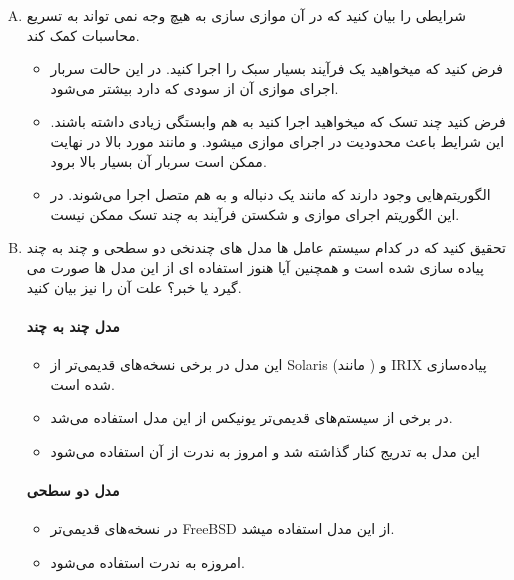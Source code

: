 \documentclass[]{article}
\begin{document}
\begin{enumerate}[(A)]
      \item ﺷﺮﺍﯾﻄﯽ ﺭﺍ ﺑﯿﺎﻥ ﮐﻨﯿﺪ ﮐﻪ ﺩﺭ ﺁﻥ ﻣﻮﺍﺯﯼ ﺳﺎﺯﯼ ﺑﻪ ﻫﯿﭻ ﻭﺟﻪ ﻧﻤﯽ ﺗﻮﺍﻧﺪ ﺑﻪ ﺗﺴﺮﯾﻊ ﻣﺤﺎﺳﺒﺎﺕ ﮐﻤﮏ ﮐﻨﺪ.
            \begin{itemize}
                  \renewcommand\labelitemi{-}
                  \item فرض کنید که میخواهید یک فرآیند بسیار سبک را اجرا کنید. در این حالت سربار اجرای موازی آن از سودی که دارد بیشتر می‌شود.
                  \item فرض کنید چند تسک که میخواهید اجرا کنید به هم وابستگی زیادی داشته باشند.
                        این شرایط باعث محدودیت در اجرای موازی میشود. و مانند مورد بالا در نهایت ممکن است سربار آن بسیار بالا برود.
                  \item الگوریتم‌هایی وجود دارند که مانند یک دنباله و به هم متصل اجرا می‌شوند.
                        در این الگوریتم‌ اجرای موازی و شکستن فرآیند به چند تسک ممکن نیست.
            \end{itemize}
      \item ﺗﺤﻘﯿﻖ ﮐﻨﯿﺪ ﮐﻪ ﺩﺭ ﮐﺪﺍﻡ ﺳﯿﺴﺘﻢ ﻋﺎﻣﻞ ﻫﺎ ﻣﺪﻝ ﻫﺎﯼ ﭼﻨﺪﻧﺨﯽ ﺩﻭ ﺳﻄﺤﯽ ﻭ ﭼﻨﺪ ﺑﻪ ﭼﻨﺪ ﭘﯿﺎﺩﻩ ﺳﺎﺯﯼ ﺷﺪﻩ ﺍﺳﺖ ﻭ ﻫﻤﭽﻨﯿﻦ ﺁﯾﺎ ﻫﻨﻮﺯ
            ﺍﺳﺘﻔﺎﺩﻩ ﺍﯼ ﺍﺯ ﺍﯾﻦ ﻣﺪﻝ ﻫﺎ ﺻﻮﺭﺕ ﻣﯽ ﮔﯿﺮﺩ ﯾﺎ ﺧﺒﺮ؟ ﻋﻠﺖ ﺁﻥ ﺭﺍ ﻧﯿﺰ ﺑﯿﺎﻥ ﮐﻨﯿﺪ.
            \vspace{-0.4cm}
            \paragraph*{مدل چند به چند }
            \begin{itemize}
                  \renewcommand\labelitemi{-}
                  \item این مدل در برخی نسخه‌های قدیمی‌تر از Solaris
                        (مانند )
                        و IRIX پیاده‌سازی شده است.
                  \item در برخی از سیستم‌های قدیمی‌تر یونیکس از این مدل استفاده می‌شد.
                  \item این مدل به تدریج کنار گذاشته شد و امروز به ندرت از آن استفاده می‌شود
            \end{itemize}
            \vspace{-0.4cm}
            \paragraph*{مدل دو سطحی }
            \begin{itemize}
                  \renewcommand\labelitemi{-}
                  \item در نسخه‌های قدیمی‌تر FreeBSD از این مدل استفاده میشد.
                  \item امروزه به ندرت استفاده می‌شود.
            \end{itemize}

\end{enumerate}
\end{document}
